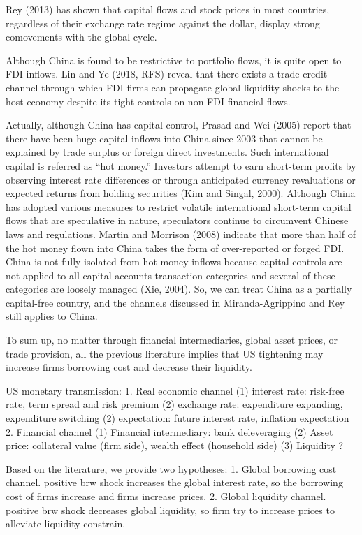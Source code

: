 \documentclass[12pt]{article}
\begin{document}
Rey (2013) has shown that capital flows and stock prices in most countries, regardless of their exchange rate regime against the dollar, display strong comovements with the global cycle.

Although China is found to be restrictive to portfolio flows, it is quite open to FDI inflows. Lin and Ye (2018, RFS) reveal that there exists a trade credit channel through which FDI firms can propagate global liquidity shocks to the host economy despite its tight controls on non-FDI financial flows.

Actually, although China has capital control, Prasad and Wei (2005) report that there have been huge capital inflows into China since 2003 that cannot be explained by trade surplus or foreign direct investments. Such international capital is referred as “hot money.” Investors attempt to earn short-term profits by observing interest rate differences or through anticipated currency revaluations or expected returns from holding securities (Kim and Singal, 2000). Although China has adopted various measures to restrict volatile international short-term capital flows that are speculative in nature, speculators continue to circumvent Chinese laws and regulations. Martin and Morrison (2008) indicate that more than half of the hot money flown into China takes the form of over-reported or forged FDI. China is not fully isolated from hot money inflows because capital controls are not applied to all capital accounts transaction categories and several of these categories are loosely managed (Xie, 2004). So, we can treat China as a partially capital-free country, and the channels discussed in Miranda-Agrippino and Rey still applies to China. 


To sum up, no matter through financial intermediaries, global asset prices, or trade provision, all the previous literature implies that US tightening may increase firms borrowing cost and decrease their liquidity.

US monetary transmission:
1. Real economic channel
(1) interest rate: risk-free rate, term spread and risk premium
(2) exchange rate: expenditure expanding, expenditure switching
(2) expectation: future interest rate, inflation expectation
2. Financial channel
(1) Financial intermediary: bank deleveraging
(2) Asset price: collateral value (firm side), wealth effect (household side)
(3) Liquidity ?

Based on the literature, we provide two hypotheses: 
1. Global borrowing cost channel. positive brw shock increases the global interest rate, so the borrowing cost of firms increase and firms increase prices. 
2. Global liquidity channel. positive brw shock decreases global liquidity, so firm try to increase prices to alleviate liquidity constrain.
\end{document}
